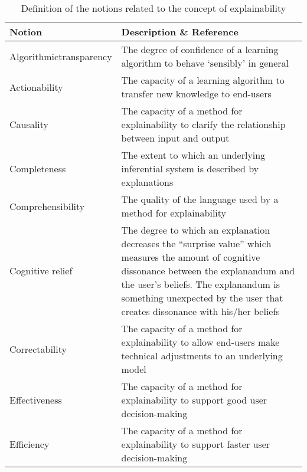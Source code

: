 \documentclass[final,1p,times]{elsarticle}
\begin{document}
\begin{table}[htbp]
\footnotesize
  \caption{Definition of the notions related to the concept of explainability}
  \label{tab:criteria}
  \begin{tabular}{m{1.7cm} m{10.9cm}}
    \hline
    Notion & Description \& Reference\\
    \hline
    Algorithmic\newline transparency & The degree of confidence of a learning algorithm to behave `sensibly' in general \cite{dam2018explainable,preece2018asking}\\
    Actionability & The capacity of a learning algorithm to transfer new knowledge to end-users \cite{kulesza2015principles,kulesza2013too}\\
    Causality & The capacity of a method for explainability to clarify the relationship between input and output \cite{fox2017explainable,chajewska1997defining,ha2018designing,holzinger2019causability,lipton2018mythos,miller2017explainable}\\
    Completeness & The extent to which an underlying inferential system is described by explanations \cite{cui2019integrative, kulesza2015principles,kulesza2013too}\\
    Comprehensibility &  The quality of the language used by a method for explainability \cite{askira1998knowledge,alonso2018bibliometric, bibal2016interpretability,bratko1997machine, doran2017does, dovsilovic2018explainable,freitas2006we,goebel2018explainable, watson2019clinical}\\
    Cognitive relief & The degree to which an explanation decreases the ``surprise value'' which measures the amount of cognitive dissonance between the explanandum and the user's beliefs. The explanandum is something unexpected by the user that creates dissonance with his/her beliefs \cite{chajewska1997defining}\\
    Correctability & The capacity of a method for explainability to allow end-users  make technical adjustments to an underlying model \cite{kulesza2015principles,kulesza2013too}\\
    Effectiveness & The capacity of a method for explainability to support good user decision-making \cite{tintarev2011designing, tintarev2015explaining, chander2018evaluating} \\
    Efficiency & The capacity of a method for explainability to support faster user decision-making \cite{tintarev2011designing, tintarev2007survey, tintarev2015explaining}\\

\end{tabular}
\end{table}
\end{document}
